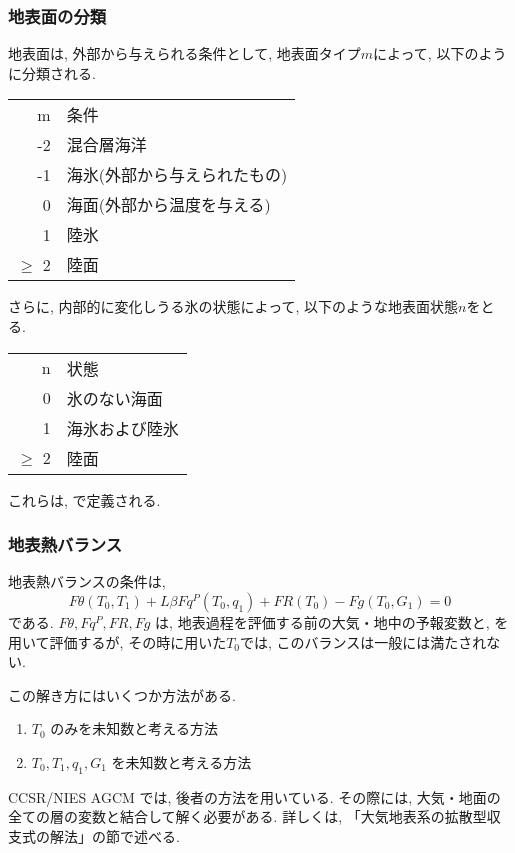 \subsubsection{地表面の分類}

地表面は, 外部から与えられる条件として, 
地表面タイプ$m$によって, 以下のように分類される.
\begin{center}
\begin{tabular}{rl}
m     & 条件 \\
-2    & 混合層海洋 \\
-1    & 海氷(外部から与えられたもの) \\
0     & 海面(外部から温度を与える) \\
1     & 陸氷 \\
$\ge$ 2 & 陸面
\end{tabular}
\end{center}

さらに, 内部的に変化しうる氷の状態によって, 
以下のような地表面状態$n$をとる.
\begin{center}
\begin{tabular}{rl}
n     & 状態 \\
0     & 氷のない海面 \\
1     & 海氷および陸氷 \\
$\ge$ 2 & 陸面
\end{tabular}
\end{center}

これらは,  で定義される.

\subsubsection{地表熱バランス}

地表熱バランスの条件は,
%
\begin{equation}
   F\theta(T_0,T_1) + L \beta Fq^P(T_0,q_1) + FR(T_0) - Fg(T_0,G_1) = 0
   \label{p-sfc:sfc-balance}
\end{equation}
%
である.
$F\theta, Fq^P, FR, Fg$ は,
地表過程を評価する前の大気・地中の予報変数と,
を用いて評価するが, 
その時に用いた$T_0$では, このバランスは一般には満たされない.

この解き方にはいくつか方法がある.
\begin{enumerate}
\item $T_0$ のみを未知数と考える方法
\item $T_0,T_1,q_1,G_1$ を未知数と考える方法
\end{enumerate}
CCSR/NIES AGCM では, 後者の方法を用いている.
その際には, 大気・地面の全ての層の変数と結合して解く必要がある.
詳しくは, 「大気地表系の拡散型収支式の解法」の節で述べる.


